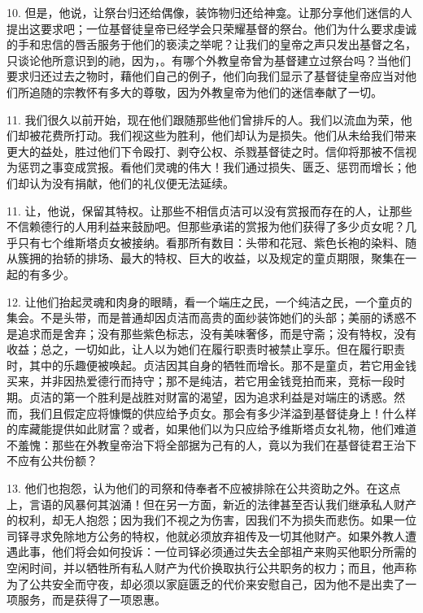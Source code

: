 10. 但是，他说，让祭台归还给偶像，装饰物归还给神龛。让那分享他们迷信的人提出这要求吧；一位基督徒皇帝已经学会只荣耀基督的祭台。他们为什么要求虔诚的手和忠信的唇舌服务于他们的亵渎之举呢？让我们的皇帝之声只发出基督之名，只谈论他所意识到的祂，因为，。有哪个外教皇帝曾为基督建立过祭台吗？当他们要求归还过去之物时，藉他们自己的例子，他们向我们显示了基督徒皇帝应当对他们所追随的宗教怀有多大的尊敬，因为外教皇帝为他们的迷信奉献了一切。\par

11. 我们很久以前开始，现在他们跟随那些他们曾排斥的人。我们以流血为荣，他们却被花费所打动。我们视这些为胜利，他们却认为是损失。他们从未给我们带来更大的益处，胜过他们下令殴打、剥夺公权、杀戮基督徒之时。信仰将那被不信视为惩罚之事变成赏报。看他们灵魂的伟大！我们通过损失、匮乏、惩罚而增长；他们却认为没有捐献，他们的礼仪便无法延续。\par

11. 让，他说，保留其特权。让那些不相信贞洁可以没有赏报而存在的人，让那些不信赖德行的人用利益来鼓励吧。但那些承诺的赏报为他们获得了多少贞女呢？几乎只有七个维斯塔贞女被接纳。看那所有数目：头带和花冠、紫色长袍的染料、随从簇拥的抬轿的排场、最大的特权、巨大的收益，以及规定的童贞期限，聚集在一起的有多少。\par

12. 让他们抬起灵魂和肉身的眼睛，看一个端庄之民，一个纯洁之民，一个童贞的集会。不是头带，而是普通却因贞洁而高贵的面纱装饰她们的头部；美丽的诱惑不是追求而是舍弃；没有那些紫色标志，没有美味奢侈，而是守斋；没有特权，没有收益；总之，一切如此，让人以为她们在履行职责时被禁止享乐。但在履行职责时，其中的乐趣便被唤起。贞洁因其自身的牺牲而增长。那不是童贞，若它用金钱买来，并非因热爱德行而持守；那不是纯洁，若它用金钱竞拍而来，竞标一段时期。贞洁的第一个胜利是战胜对财富的渴望，因为追求利益是对端庄的诱惑。然而，我们且假定应将慷慨的供应给予贞女。那会有多少洋溢到基督徒身上！什么样的库藏能提供如此财富？或者，如果他们以为只应给予维斯塔贞女礼物，他们难道不羞愧：那些在外教皇帝治下将全部据为己有的人，竟以为我们在基督徒君王治下不应有公共份额？\par

13. 他们也抱怨，认为他们的司祭和侍奉者不应被排除在公共资助之外。在这点上，言语的风暴何其汹涌！但在另一方面，新近的法律甚至否认我们继承私人财产的权利，却无人抱怨；因为我们不视之为伤害，因我们不为损失而悲伤。如果一位司铎寻求免除地方公务的特权，他就必须放弃祖传及一切其他财产。如果外教人遭遇此事，他们将会如何投诉：一位司铎必须通过失去全部祖产来购买他职分所需的空闲时间，并以牺牲所有私人财产为代价换取执行公共职务的权力；而且，他声称为了公共安全而守夜，却必须以家庭匮乏的代价来安慰自己，因为他不是出卖了一项服务，而是获得了一项恩惠。\par

